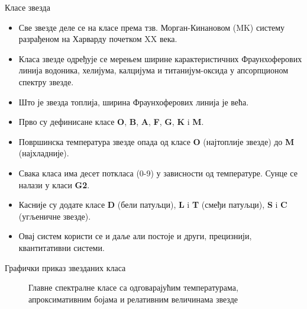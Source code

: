\documentclass[aspectratio=169, xcolor=table, 10pt]{beamer}
\theoremstyle{definition}
\begin{document}
\begin{frame}{Класе звезда}
  \begin{itemize}
    \item Све звезде деле се на класе према тзв. Морган-Кинановом (MK) систему разрађеном на Харварду почетком XX века.\cite{britannica1}
    \item Класа звезде одређује се мерењем ширине карактеристичних Фраунхоферових линија водоника, хелијума, калцијума и титанијум-оксида у апсорпционом спектру звезде.
    \item Што је звезда топлија, ширина Фраунхоферових линија је већа.
    \item Прво су дефинисане класе \textbf{O}, \textbf{B}, \textbf{A}, \textbf{F}, \textbf{G}, \textbf{K} i \textbf{M}.
    \item Површинска температура звезде опада од класе \textbf{O} (најтоплије звезде) до \textbf{M} (најхладније).
    \item Свака класа има десет поткласа (0-9) у зависности од температуре. Сунце се налази у класи \textbf{G2}.
    \item Касније су додате класе \textbf{D} (бели патуљци), \textbf{L} i \textbf{T} (смеђи патуљци), \textbf{S} i \textbf{C} (угљеничне звезде).
    \item Овај систем користи се и даље али постоје и други, прецизнији, квантитативни системи.
  \end{itemize}
\end{frame}

\begin{frame}{Графички приказ звезданих класа}
  \begin{figure}
    \centering
    \captionsetup{width=\wd0}
    \caption{Главне спектралне класе са одговарајућим температурама, апроксимативним бојама и релативним величинама звезде}
  \end{figure}
\end{frame}
\end{document}
